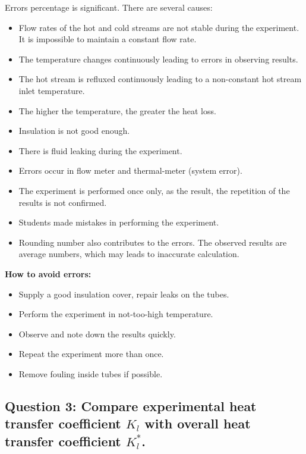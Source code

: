 Errors percentage is significant. There are several causes:
\begin{itemize}
    \item Flow rates of the hot and cold streams are not stable during the experiment. It is impossible to maintain a constant flow rate.
    \item The temperature changes continuously leading to errors in observing results.
    \item The hot stream is refluxed continuously leading to a non-constant hot stream inlet temperature.
    \item The higher the temperature, the greater the heat loss.
    \item Insulation is not good enough.
    \item There is fluid leaking during the experiment.
    \item Errors occur in flow meter and thermal-meter (system error).
    \item The experiment is performed once only, as the result, the repetition of the results is not confirmed.
    \item Students made mistakes in performing the experiment.
    \item Rounding number also contributes to the errors. The observed results are average numbers, which may leads to inaccurate calculation.
\end{itemize}

\textbf{How to avoid errors:}
\begin{itemize}
    \item Supply a good insulation cover, repair leaks on the tubes.
    \item Perform the experiment in not-too-high temperature.
    \item Observe and note down the results quickly.
    \item Repeat the experiment more than once.
    \item Remove fouling inside tubes if possible.
\end{itemize}

\subsection*{Question 3: Compare experimental heat transfer coefficient $K_l$ with overall heat transfer coefficient $K_l^*$.}\label{q3-comparison}

